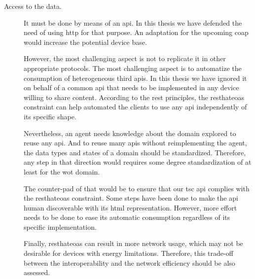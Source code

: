 \begin{description}
  \item[Access to the data.] It must be done by means of an \ac{api}.
			    In this thesis we have defended the need of using \ac{http} for that purpose.
			    An adaptation for the upcoming \ac{coap} would increase the potential device base. %
			    
			    However, the most challenging aspect is not to replicate it in other appropriate protocols.
			    The most challenging aspect is to automatize the consumption of heterogeneous third \acp{api}.
			    In this thesis we have ignored it on behalf of a common \ac{api} that needs to be implemented in any device willing to share content. %
			    According to the \ac{rest} principles, the \ac{resthateoas} constraint can help automated the clients to use any \ac{api} independently of its specific shape. %
			    
			    Nevertheless, an agent needs knowledge about the domain explored to reuse any \ac{api}.
			    And to reuse many \acp{api} without reimplementing the agent, the data types and states of a domain should be standardized. %
			    Therefore, any step in that direction would requires some degree standardization of at least for the \ac{wot} domain.
			    
			    The counter-pad of that would be to ensure that our \ac{tsc} \ac{api} complies with the \ac{resthateoas} constraint.
			    Some steps have been done to make the \ac{api} human discoverable with its \ac{html} representation.
			    However, more effort needs to be done to ease its automatic consumption regardless of its specific implementation. %
			    
			    Finally, \ac{resthateoas} can result in more network usage, which may not be desirable for devices with energy limitations.
			    Therefore, this trade-off between the interoperability and the network efficiency should be also assessed.
			    

\end{description}
